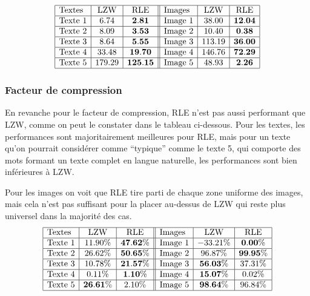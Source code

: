 \documentclass{article}[letterpaper, 11pt]
\begin{document}
\[
\begin{array}{|l|c|c||l|c|c|} \hline %
\text{Textes} & \text{LZW} & \text{RLE} & \text{Images} & \text{LZW} & \text{RLE}\\\hline %
\text{Texte } 1 & 6.74   & \bf{2.81}  & \text{Image } 1 & 38.00  & \bf{12.04}\\ \hline %
\text{Texte } 2 & 8.09   & \bf{3.53}  & \text{Image } 2 & 10.40  & \bf{0.38}\\ \hline %
\text{Texte } 3 & 8.64   & \bf{5.55}  & \text{Image } 3 & 113.19 & \bf{36.00}\\ \hline %
\text{Texte } 4 & 33.48  & \bf{19.70} & \text{Image } 4 & 146.76 & \bf{72.29}\\ \hline %
\text{Texte } 5 & 179.29 & \bf{125.15}& \text{Image } 5 & 48.93  & \bf{2.26}\\ \hline %
\end{array}\]
\subsubsection{Facteur de compression}
En revanche pour le facteur de compression, RLE n'est pas aussi performant que LZW, comme on peut le constater dans le tableau ci-dessous. Pour les textes, les performances sont majoritairement meilleures pour RLE, mais pour un texte qu'on pourrait considérer comme ``typique'' comme le texte 5, qui comporte des mots formant un texte complet en langue naturelle, les performances sont bien inférieures à LZW.\@

Pour les images on voit que RLE tire parti de chaque zone uniforme des images, mais cela n'est pas suffisant pour la placer au-dessus de LZW qui reste plus universel dans la majorité des cas.
\[
\begin{array}{|l|c|c||l|c|c|} \hline %
\text{Textes} & \text{LZW} & \text{RLE} & \text{Images} & \text{LZW} & \text{RLE}\\\hline %
\text{Texte } 1 & 11.90\% & \bf{47.62\%} & \text{Image } 1 & -33.21\% & \bf{0.00\%}\\ \hline %
\text{Texte } 2 & 26.62\% & \bf{50.65\%} & \text{Image } 2 & 96.87\% & \bf{99.95\%}\\ \hline %
\text{Texte } 3 & 10.78\% & \bf{21.57\%} & \text{Image } 3 & \bf{56.03\%} & 37.31\%\\ \hline %
\text{Texte } 4 & 0.11\%  & \bf{1.10\%}  & \text{Image } 4 & \bf{15.07\%} & 0.02\%\\ \hline %
\text{Texte } 5 & \bf{26.61}\% & 2.10\%  & \text{Image } 5 & \bf{98.64\%} & 96.84\%\\ \hline %
\end{array}\]
\end{document}
